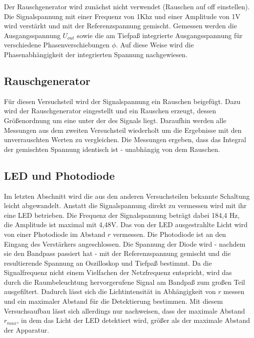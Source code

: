Der Rauschgenerator wird zunächst nicht verwendet (Rauschen auf off einstellen).
Die Signalspannung mit einer Frequenz von 1Khz und einer Amplitude von 1V
wird verstärkt und mit der
Referenzspannung gemischt. Gemessen werden die Ausgangsspannung $U_{out}$
sowie die am Tiefpaß
integrierte Ausgangsspannung für verschiedene Phasenverschiebungen $\phi$. Auf
diese
Weise wird die Phasenabhängigkeit der integrierten Spannung nachgewiesen.

\subsection{Rauschgenerator}
Für diesen Versuchsteil wird der Signalspannung ein Rauschen beigefügt. Dazu
wird der Rauschgenerator eingestellt und ein Rauschen erzeugt, dessen
Größenordnung um eine unter der des Signals liegt. Daraufhin werden alle
Messungen aus dem zweiten Versuchsteil wiederholt um die Ergebnisse mit den
unverrauschten Werten zu vergleichen. Die Messungen ergeben, dass das Integral
der gemischten Spannung identisch ist - unabhängig von dem Rauschen.

\subsection{LED und Photodiode}
Im letzten Abschnitt wird die aus den anderen Versuchsteilen bekannte Schaltung
leicht abgewandelt. Anstatt die Signalspannung direkt zu vermessen wird mit ihr
eine LED betrieben. Die Frequenz der Signalspannung
beträgt dabei 184,4 Hz, die Amplitude ist
maximal mit 4,48V. Das von der LED ausgestrahlte Licht wird von einer Photodiode
im Abstand $r$ vermessen. Die Photodiode ist an den Eingang des Verstärkers
angeschlossen. Die Spannung der Diode wird
- nachdem sie den Bandpass passiert hat - mit der
Referenzspannung gemischt und die resultierende Spannung an
Oszilloskop und Tiefpaß bestimmt. Da die Signalfrequenz nicht einem Vielfachen
der Netzfrequenz entspricht, wird das durch die Raumbeleuchtung hervorgerufene
Signal am Bandpaß
zum großen Teil ausgefiltert. Dadurch lässt sich die Lichtintensität in
Abhängigkeit von $r$ messen und ein maximaler Abstand für die Detektierung
bestimmen. Mit diesem Versuchsaufbau lässt sich allerdings nur nachweisen, dass
der maximale Abstand $r_{max}$, in dem das Licht der LED detektiert wird,
größer als der maximale Abstand der Apparatur.

